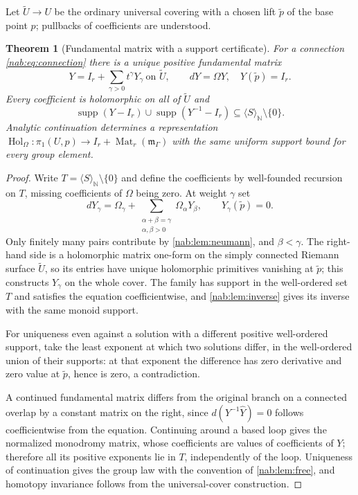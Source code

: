 \documentclass[11pt,letterpaper]{article}
\newtheorem{theorem}{Theorem}[section]
\theoremstyle{definition}
\theoremstyle{remark}
\newcommand{\N}{\mathbb N}
\newcommand{\mm}{\mathfrak m_\Gamma}
\newcommand{\Mat}{\operatorname{Mat}}
\newcommand{\supp}{\operatorname{supp}}
\newcommand{\Hol}{\operatorname{Hol}}
\newcommand{\angles}[1]{\langle #1\rangle_{\N}}
\numberwithin{equation}{section}
\begin{document}
Let $\widetilde U\to U$ be the ordinary universal covering with a chosen lift
$\widetilde p$ of the base point $p$; pullbacks of coefficients are
understood.

\begin{theorem}[Fundamental matrix with a support certificate]
\label{nab:thm:fundamental}
For a connection \eqref{nab:eq:connection} there is a unique positive
fundamental matrix
\[
 Y=I_r+\sum_{\gamma>0}t^\gamma Y_\gamma\ \text{on }\widetilde U,
 \qquad dY=\Omega Y,\quad Y(\widetilde p)=I_r.
\]
Every coefficient is holomorphic on all of $\widetilde U$ and
\[
 \supp(Y-I_r)\cup\supp(Y^{-1}-I_r)\subseteq\angles S\setminus\{0\}.
\]
Analytic continuation determines a representation
$\Hol_\Omega:\pi_1(U,p)\to I_r+\Mat_r(\mm)$ with the same uniform support
bound for \emph{every} group element.
\end{theorem}

\begin{proof}
Write $T=\angles S\setminus\{0\}$ and define the coefficients by well-founded
recursion on $T$, missing coefficients of $\Omega$ being zero. At weight
$\gamma$ set
\begin{equation}\label{nab:eq:solrec}
 dY_\gamma=\Omega_\gamma
 +\sum_{\substack{\alpha+\beta=\gamma\\ \alpha,\beta>0}}\Omega_\alpha Y_\beta,
 \qquad Y_\gamma(\widetilde p)=0.
\end{equation}
Only finitely many pairs contribute by \cref{nab:lem:neumann}, and
$\beta<\gamma$. The right-hand side is a holomorphic matrix one-form on the
simply connected Riemann surface $\widetilde U$, so its entries have unique
holomorphic primitives vanishing at $\widetilde p$; this constructs $Y_\gamma$
on the whole cover. The family has support in the well-ordered set $T$ and
satisfies the equation coefficientwise, and \cref{nab:lem:inverse} gives its
inverse with the same monoid support.

For uniqueness even against a solution with a different positive well-ordered
support, take the least exponent at which two solutions differ, in the
well-ordered union of their supports: at that exponent the difference has zero
derivative and zero value at $\widetilde p$, hence is zero, a contradiction.

A continued fundamental matrix differs from the original branch on a connected
overlap by a constant matrix on the right, since $d(Y^{-1}\widehat Y)=0$
follows coefficientwise from the equation. Continuing around a based loop gives
the normalized monodromy matrix, whose coefficients are values of coefficients
of $Y$; therefore all its positive exponents lie in $T$, independently of the
loop. Uniqueness of continuation gives the group law with the convention of
\cref{nab:lem:free}, and homotopy invariance follows from the universal-cover
construction.
\end{proof}
\end{document}
